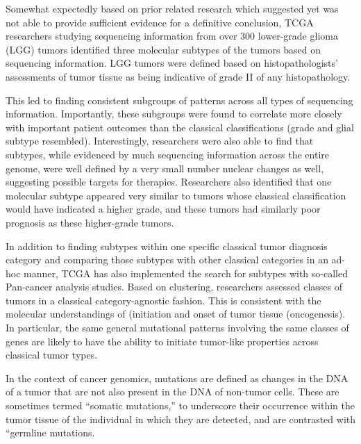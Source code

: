         Somewhat expectedly based on prior related research which suggested
        yet was not able to provide sufficient evidence for a definitive
        conclusion, TCGA researchers studying sequencing information from over
        300 lower-grade glioma (LGG) tumors identified three molecular
        subtypes of the tumors based on sequencing information. LGG tumors
        were defined based on histopathologists’ assessments of tumor tissue
        as being indicative of grade II of any histopathology.


        This led to finding consistent subgroups of patterns across
        all types of  sequencing information. Importantly, these
        subgroups were found to correlate more closely with important
        patient outcomes than the classical classifications (grade and
        glial subtype resembled). Interestingly, researchers were also
        able to find that subtypes, while evidenced by much sequencing
        information across the entire genome, were well defined by a
        very small number nuclear changes as well, suggesting possible
        targets for therapies. Researchers also identified that one
        molecular subtype appeared very similar to tumors whose
        classical classification would have indicated a higher grade,
        and these tumors had similarly poor prognosis as these
        higher-grade tumors.


        

        In addition to finding subtypes within one specific classical tumor
        diagnosis category and comparing those subtypes with other classical
        categories in an ad-hoc manner, TCGA has also implemented the search
        for subtypes with so-called Pan-cancer analysis\cite{weinstein_cancer_2013} studies. Based on
        clustering, researchers assessed classes of tumors in a classical
        category-agnostic fashion. This is consistent with the molecular
        understandings of (initiation and onset of tumor tissue
        (oncogenesis). In particular, the same general mutational patterns
        involving the same classes of genes are likely to have the ability to
        initiate tumor-like properties across classical tumor
        types.

        In the context of cancer genomics, mutations are defined as changes in the DNA of a
        tumor that are not also present in the DNA of non-tumor
        cells. These are sometimes termed ``somatic mutations,'' to
        underscore their occurrence within the tumor tissue of the
        individual in which they are detected, and are contrasted with
        ``germline mutations.


